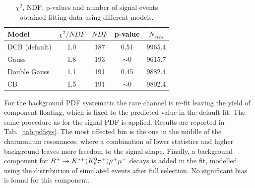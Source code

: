 \begin{center}
\begin{table}[h]
\centering
\caption{$\chi^2$, NDF, p-values and number of signal events obtained fitting \Lb\to\jpsi\Lz data using different models.}
\begin{tabular}{lcccc}
\hline
Model   		& $\chi^2/NDF$  & $NDF$  & p-value  & $N_{evts}$ \\ \hline
DCB  (default)	&    1.0   &   187   &    0.51      & 9965.4  \\
Gauss			&    1.8   &   193   &    $\sim 0$  & 9615.7 \\
Double Gauss  	&    1.1   &   191   &    0.45      & 9882.4  \\
CB  			&    1.5   &   191   &    $\sim 0$  & 9802.4 \\
\hline
\end{tabular}
\label{PDFsys}
\end{table}
\end{center}

For the background PDF systematic the rare channel is re-fit leaving the yield of \KS component floating,
which is fixed to the predicted value in the default fit. The same procedure as for the signal PDF is applied.
Results are reported in Tab.~\ref{tab:pdfsys}. The most affected bin is the one in the middle of the charmonium
resonances, where a combination of lower statistics and higher background leaves more freedom to the signal shape.
Finally, a background component for $B^{+} \ra K^{*+}(\KS\pi^+)\mumu$ decays is added in the fit, modelled using
the distribution of simulated events after full selection. No significant bias is found for this component.

